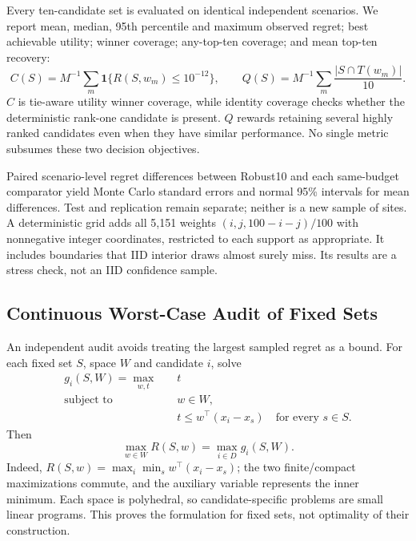 \documentclass{llncs}
\newcommand{\ind}{\mathbf{1}}
\begin{document}
Every ten-candidate set is evaluated on identical independent scenarios. We report mean, median, 95th percentile and maximum observed regret; best achievable utility; winner coverage; any-top-ten coverage; and mean top-ten recovery:
\begin{equation}
 C(S)=M^{-1}\sum_m\ind\{R(S,w_m)\leq10^{-12}\},\qquad
 Q(S)=M^{-1}\sum_m\frac{|S\cap T(w_m)|}{10}.
\label{eq:coverage}
\end{equation}
$C$ is tie-aware utility winner coverage, while identity coverage checks whether the deterministic rank-one candidate is present. $Q$ rewards retaining several highly ranked candidates even when they have similar performance. No single metric subsumes these two decision objectives.

Paired scenario-level regret differences between Robust10 and each same-budget comparator yield Monte Carlo standard errors and normal 95\% intervals for mean differences. Test and replication remain separate; neither is a new sample of sites. A deterministic grid adds all 5,151 weights $(i,j,100-i-j)/100$ with nonnegative integer coordinates, restricted to each support as appropriate. It includes boundaries that IID interior draws almost surely miss. Its results are a stress check, not an IID confidence sample.

\subsection{Continuous Worst-Case Audit of Fixed Sets}
An independent audit avoids treating the largest sampled regret as a bound. For each fixed set $S$, space $W$ and candidate $i$, solve
\begin{equation}
 \begin{aligned}
 g_i(S,W)=\max_{w,t}\quad&t\\[-2pt]
 \text{subject to}\quad&w\in W,\\[-2pt]
 &t\leq w^\top(x_i-x_s)\quad\text{for every }s\in S.
 \end{aligned}
\label{eq:lp}
\end{equation}
Then
\begin{equation}
 \max_{w\in W}R(S,w)=\max_{i\in D}g_i(S,W).
\label{eq:lpidentity}
\end{equation}
Indeed, $R(S,w)=\max_i\min_s w^\top(x_i-x_s)$; the two finite/compact maximizations commute, and the auxiliary variable represents the inner minimum. Each space is polyhedral, so candidate-specific problems are small linear programs. This proves the formulation for fixed sets, not optimality of their construction.
\end{document}
